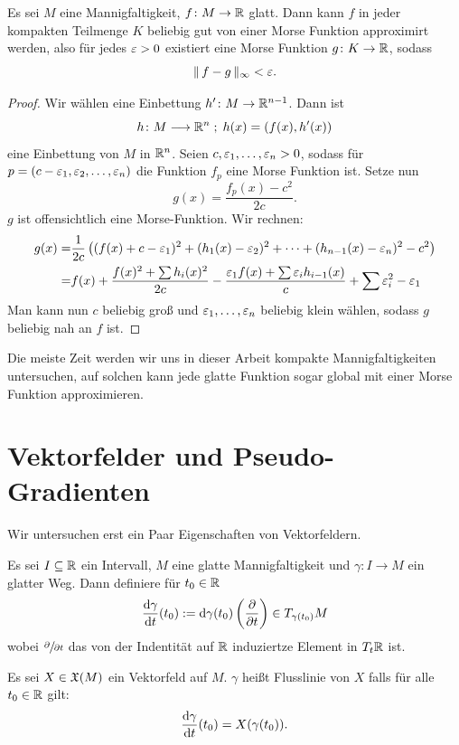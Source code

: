 \begin{theorem}
    \label{satz: morse-approximation}
    Es sei $M$ eine Mannigfaltigkeit, $f \colon M \to { \mathbb R }$ glatt. Dann kann $f$ in jeder kompakten
    Teilmenge $K$ beliebig gut von einer Morse Funktion approximirt werden, also für jedes 
    $\varepsilon > 0$ existiert eine Morse Funktion $g \colon K \to { \mathbb R }$, sodass 
    \[ \| \, f - g \, \|_{\infty} < \varepsilon . \]
\end{theorem}

\begin{proof}
    Wir wählen eine Einbettung $h' \colon M \to { \mathbb R }^{n - 1}$. Dann ist 
    \[ h \colon M \longrightarrow { \mathbb R }^n \; ; \; h(x) = (f(x), h'(x)) \]
    eine Einbettung von $M$ in ${ \mathbb R }^n$. Seien $c, \varepsilon_1, \dots, \varepsilon_n > 0$, sodass für \\
    $p = (c - \varepsilon_1, \varepsilon_2, \dots, \varepsilon_n)$ die Funktion $f_p$ eine Morse Funktion ist.
    Setze nun 
    \[ g(x) = \frac{f_p(x) - c^2}{2c} . \]
    $g$ ist offensichtlich eine Morse-Funktion. Wir rechnen:
    \begin{align*}
        g(x) = & \frac{1}{2c} \left( (f(x) + c - \varepsilon_1)^2 + (h_1(x) - \varepsilon_2)^2 
            + \dots + (h_{n-1}(x) - \varepsilon_n)^2 - c^2 \right) \\
        = & f(x) + \frac{f(x)^2 + \sum h_i(x)^2}{2c} - \frac{\varepsilon_1 f(x) 
            + \sum \varepsilon_i h_{i - 1}(x)}{c} + \sum \varepsilon_i^2 - \varepsilon_1
    \end{align*}
    Man kann nun $c$ beliebig groß und $\varepsilon_1, \dots, \varepsilon_n$ beliebig klein wählen,
    sodass $g$ beliebig nah an $f$ ist.
\end{proof}

\begin{remark}
    Die meiste Zeit werden wir uns in dieser Arbeit kompakte Mannigfaltigkeiten untersuchen,
    auf solchen kann jede glatte Funktion sogar global mit einer Morse Funktion approximieren.
\end{remark}

\section{Vektorfelder und Pseudo-Gradienten}

Wir untersuchen erst ein Paar Eigenschaften von Vektorfeldern.

\begin{definition}[Flusslinie]
    \label{def: flussliene}
    Es sei $I \subseteq { \mathbb R }$ ein Intervall, $M$ eine glatte Mannigfaltigkeit und  
    $\gamma \colon I  \to M$ ein glatter Weg. Dann definiere für $t_0 \in { \mathbb R }$
    \[ \derive[\gamma]{t} (t_0) := 
        \opd \gamma (t_0) \left( \pderive{t} \right) \in T_{\gamma(t_0)}M \]
    wobei $\pderive{t}$ das von der Indentität auf ${ \mathbb R }$ induziertze Element in $T_t{ \mathbb R }$ ist.

    Es sei $X \in { \mathfrak{X} } (M)$ ein Vektorfeld auf $M$. $\gamma$ heißt Flusslinie von $X$
    falls für alle $t_0 \in { \mathbb R }$ gilt: 
    \[ \derive[\gamma]{t}(t_0) = X(\gamma(t_0)) . \]
\end{definition}


